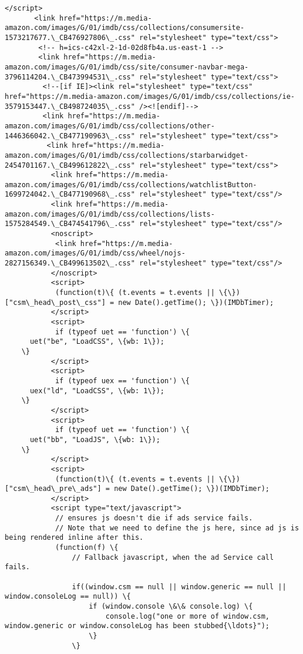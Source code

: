\documentclass[11pt]{article}
\begin{document}
\begin{Verbatim}[commandchars=\\\{\}]
       </script>
       <link href="https://m.media-amazon.com/images/G/01/imdb/css/collections/consumersite-1573217677.\_CB476927806\_.css" rel="stylesheet" type="text/css">
        <!-- h=ics-c42xl-2-1d-02d8fb4a.us-east-1 -->
        <link href="https://m.media-amazon.com/images/G/01/imdb/css/site/consumer-navbar-mega-3796114204.\_CB473994531\_.css" rel="stylesheet" type="text/css">
         <!--[if IE]><link rel="stylesheet" type="text/css" href="https://m.media-amazon.com/images/G/01/imdb/css/collections/ie-3579153447.\_CB498724035\_.css" /><![endif]-->
         <link href="https://m.media-amazon.com/images/G/01/imdb/css/collections/other-1446366042.\_CB477190963\_.css" rel="stylesheet" type="text/css">
          <link href="https://m.media-amazon.com/images/G/01/imdb/css/collections/starbarwidget-2454701167.\_CB499612822\_.css" rel="stylesheet" type="text/css">
           <link href="https://m.media-amazon.com/images/G/01/imdb/css/collections/watchlistButton-1699724042.\_CB477190968\_.css" rel="stylesheet" type="text/css"/>
           <link href="https://m.media-amazon.com/images/G/01/imdb/css/collections/lists-1575284549.\_CB474541796\_.css" rel="stylesheet" type="text/css"/>
           <noscript>
            <link href="https://m.media-amazon.com/images/G/01/imdb/css/wheel/nojs-2827156349.\_CB499613502\_.css" rel="stylesheet" type="text/css"/>
           </noscript>
           <script>
            (function(t)\{ (t.events = t.events || \{\})["csm\_head\_post\_css"] = new Date().getTime(); \})(IMDbTimer);
           </script>
           <script>
            if (typeof uet == 'function') \{
      uet("be", "LoadCSS", \{wb: 1\});
    \}
           </script>
           <script>
            if (typeof uex == 'function') \{
      uex("ld", "LoadCSS", \{wb: 1\});
    \}
           </script>
           <script>
            if (typeof uet == 'function') \{
      uet("bb", "LoadJS", \{wb: 1\});
    \}
           </script>
           <script>
            (function(t)\{ (t.events = t.events || \{\})["csm\_head\_pre\_ads"] = new Date().getTime(); \})(IMDbTimer);
           </script>
           <script type="text/javascript">
            // ensures js doesn't die if ads service fails.  
            // Note that we need to define the js here, since ad js is being rendered inline after this.
            (function(f) \{
                // Fallback javascript, when the ad Service call fails.  
                
                if((window.csm == null || window.generic == null || window.consoleLog == null)) \{
                    if (window.console \&\& console.log) \{
                        console.log("one or more of window.csm, window.generic or window.consoleLog has been stubbed{\ldots}");
                    \}
                \}
                

\end{Verbatim}
\end{document}

